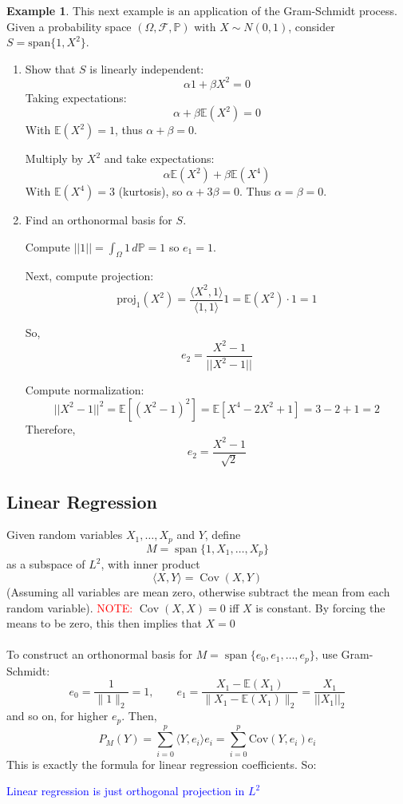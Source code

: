 \documentclass[11pt,a4paper]{article}
\theoremstyle{definition}
\newtheorem{example}{Example}[section]
\begin{document}
\begin{example}
This next example is an application of the Gram-Schmidt process. Given a probability space $(\Omega, \mathcal{F}, \mathbb{P})$ with $X \sim N(0,1)$, consider $S = \text{span}\{1, X^2\}$.

\begin{enumerate}
    \item[(i)] Show that $S$ is linearly independent:
    \[
    \alpha 1 + \beta X^2 = 0
    \]
    Taking expectations:
    \[
    \alpha + \beta \mathbb{E}(X^2) = 0
    \]
    With $\mathbb{E}(X^2) = 1$, thus $\alpha + \beta = 0$.

    Multiply by $X^2$ and take expectations:
    \[
    \alpha \mathbb{E}(X^2) + \beta \mathbb{E}(X^4)
    \]
    With $\mathbb{E}(X^4) = 3$ (kurtosis), so $\alpha + 3\beta = 0$. Thus $\alpha = \beta = 0$.

    \item[(ii)] Find an orthonormal basis for $S$.

    Compute $||1|| = \int_{\Omega} 1\,d\mathbb{P} = 1$ so $e_1 = 1$.

    Next, compute projection:
    \[
    \text{proj}_1(X^2) = \frac{\langle X^2, 1 \rangle}{\langle 1, 1 \rangle} 1 = \mathbb{E}(X^2) \cdot 1 = 1
    \]

    So,
    \[
    e_2 = \frac{X^2 - 1}{||X^2 - 1||}
    \]

    Compute normalization:
    \[
    ||X^2 - 1||^2 = \mathbb{E}[(X^2-1)^2] = \mathbb{E}[X^4 - 2X^2 + 1] = 3 - 2 + 1 = 2
    \]
    Therefore,
    \[
    e_2 = \frac{X^2-1}{\sqrt{2}}
    \]
\end{enumerate}
\end{example}


\subsection{Linear Regression}

Given random variables $X_1, \dots, X_p$ and $Y$, define
\[
M = \operatorname{span} \{1, X_1, \dots, X_p\}
\]
as a subspace of $L^2$, with inner product
\[
\langle X, Y \rangle = \operatorname{Cov}(X, Y)
\]
(Assuming all variables are mean zero, otherwise subtract the mean from each random variable).
\noindent
\textcolor{red}{NOTE:} $\operatorname{Cov}(X, X)=0$ iff $X$ is constant. By forcing the means to be zero, this then implies that $X = 0$
\\ ~\\\noindent
To construct an orthonormal basis for $M = \operatorname{span}\{e_0, e_1, \ldots, e_p \}$, use Gram-Schmidt:
\[
e_0 = \frac{1}{\|1\|_2} = 1, \qquad
e_1 = \frac{X_1 - \mathbb{E}({X}_1)}{\|X_1 - \mathbb{E}({X}_1)\|_2} = \frac{X_1}{ ||X_1||_2}
\]
and so on, for higher $e_p$.
\noindent
Then,
\[
P_M(Y) = \sum_{i=0}^p \langle Y, e_i \rangle e_i = \sum \limits _{i=0}^p \text{Cov}(Y, e_i)e_i
\]
This is exactly the formula for linear regression coefficients. So: \\ \begin{center} \textcolor{blue}{
Linear regression is just orthogonal projection in $L^2$}\end{center}
\end{document}
